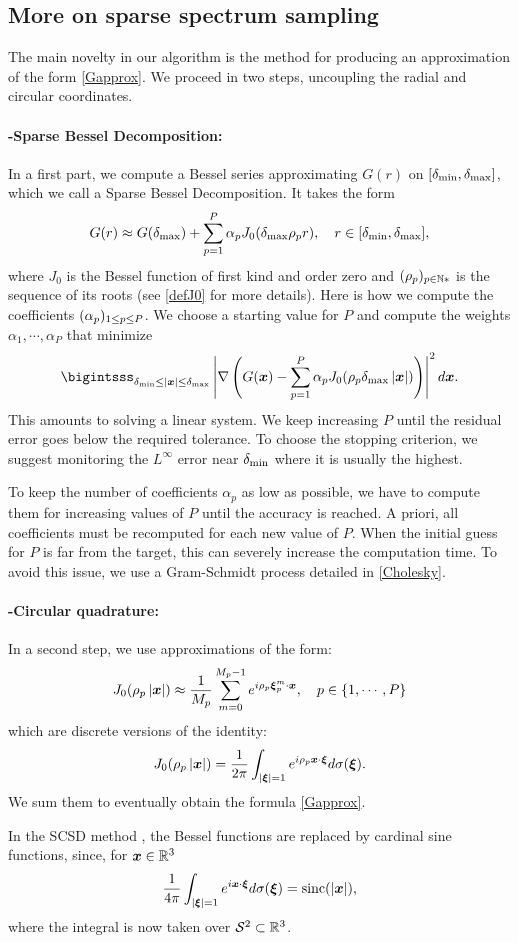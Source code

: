 \documentclass[11pt,a4paper]{article}
\begin{document}
\subsection*{More on sparse spectrum sampling}
The main novelty in our algorithm is the method for producing an approximation of the form \eqref{Gapprox}. We proceed in two steps, uncoupling the radial and circular coordinates. 

\paragraph{-Sparse Bessel Decomposition:} In a first part, we compute a Bessel series approximating $G(r)$ on $[\delta_{\min},\delta_{\max}]$, which we call a Sparse Bessel Decomposition. It takes the form
\[G(r) \approx G(\delta_{\max}) + \sum_{p=1}^P \alpha_p J_0(\delta_{\max} \rho_p r), \quad r \in [\delta_{\min},\delta_{\max}],\]
where $J_0$ is the Bessel function of first kind and order zero and $(\rho_p)_{p \in \mathbb{N}*}$ is the sequence of its roots (see \autoref{defJ0} for more details). Here is how we compute the coefficients $(\alpha_{p})_{1 \leq p \leq P}$. We choose a starting value for $P$ and compute the weights $\alpha_1,\cdots, \alpha_{P}$ that minimize
\[\bigintsss_{\rmin \leq |\bs{x}|\leq \rmax} \abs{\nabla \left(G(\bs{x}) - \sum_{p=1}^P \alpha_p J_0(\rho_p \rmax \abs{\bs{x}})\right)}^2 d\bs{x}.\]
This amounts to solving a linear system. We keep increasing $P$ until the residual error goes below the required tolerance. To choose the stopping criterion, we suggest monitoring the $L^{\infty}$ error near $\delta_{\min}$ where it is usually the highest. 

To keep the number of coefficients $\alpha_p$ as low as possible, we have to compute them for increasing values of $P$ until the accuracy is reached. A priori, all coefficients must be recomputed for each new value of $P$. When the initial guess for $P$ is far from the target, this can severely increase the computation time. To avoid this issue, we use a Gram-Schmidt process detailed in \autoref{Cholesky}.

\paragraph{-Circular quadrature:} In a second step, we use approximations of the form:
\[J_0(\rho_p \left\lvert \boldsymbol{x} \right\rvert) \approx \dfrac{1}{M_p}\sum_{m=0}^{M_p-1}e^{i \rho_p \boldsymbol{\xi}_p^m \cdot \boldsymbol{x}}, \quad p \in \{1,\cdots,P\}\]
which are discrete versions of the identity:
\[ J_0(\rho_p\left\lvert \boldsymbol{x} \right\rvert) = \frac{1}{2\pi}\int_{\left\lvert \boldsymbol{\xi} \right\rvert=1}{e^{i \rho_p\boldsymbol{x} \cdot \boldsymbol{\xi}}} d\sigma(\boldsymbol{\xi}).\]
We sum them to eventually obtain the formula \eqref{Gapprox}. 
\begin{Rem}
	In the SCSD method \cite{Alouges2015}, the Bessel functions are replaced by cardinal sine functions, since, for $\boldsymbol{x} \in \mathbb{R}^3$
	\[ \frac{1}{4\pi}\int_{\left\lvert \boldsymbol{\xi} \right\rvert=1} e^{i \boldsymbol{x}\cdot \boldsymbol{\xi}} d\sigma(\boldsymbol{\xi}) = \textup{sinc}(\left\lvert \boldsymbol{x} \right\rvert),\]
	where the integral is now taken over $\mathcal{S}^2 \subset \mathbb{R}^3$.
\end{Rem}
\end{document}
